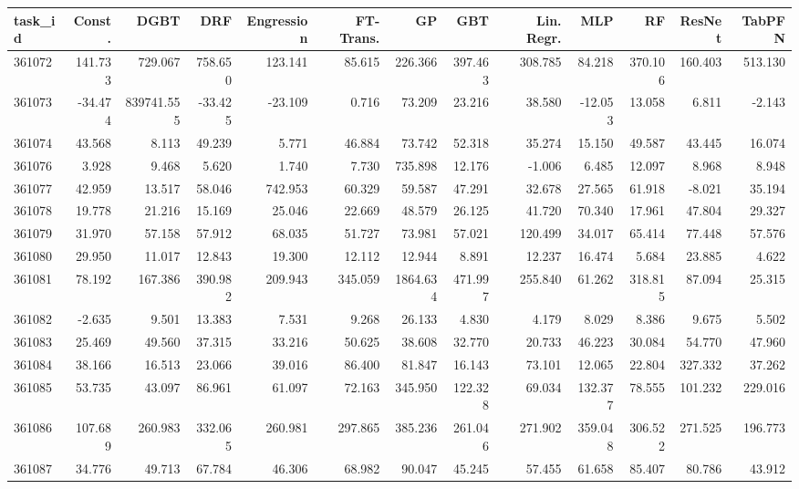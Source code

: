 \begin{tabular}{lrrrrrrrrrrrr}
\toprule
task\_id & Const. & DGBT & DRF & Engression & FT-Trans. & GP & GBT & Lin. Regr. & MLP & RF & ResNet & TabPFN \\
\midrule
361072 & 141.733 & 729.067 & 758.650 & 123.141 & 85.615 & 226.366 & 397.463 & 308.785 & 84.218 & 370.106 & 160.403 & 513.130 \\
361073 & -34.474 & 839741.555 & -33.425 & -23.109 & 0.716 & 73.209 & 23.216 & 38.580 & -12.053 & 13.058 & 6.811 & -2.143 \\
361074 & 43.568 & 8.113 & 49.239 & 5.771 & 46.884 & 73.742 & 52.318 & 35.274 & 15.150 & 49.587 & 43.445 & 16.074 \\
361076 & 3.928 & 9.468 & 5.620 & 1.740 & 7.730 & 735.898 & 12.176 & -1.006 & 6.485 & 12.097 & 8.968 & 8.948 \\
361077 & 42.959 & 13.517 & 58.046 & 742.953 & 60.329 & 59.587 & 47.291 & 32.678 & 27.565 & 61.918 & -8.021 & 35.194 \\
361078 & 19.778 & 21.216 & 15.169 & 25.046 & 22.669 & 48.579 & 26.125 & 41.720 & 70.340 & 17.961 & 47.804 & 29.327 \\
361079 & 31.970 & 57.158 & 57.912 & 68.035 & 51.727 & 73.981 & 57.021 & 120.499 & 34.017 & 65.414 & 77.448 & 57.576 \\
361080 & 29.950 & 11.017 & 12.843 & 19.300 & 12.112 & 12.944 & 8.891 & 12.237 & 16.474 & 5.684 & 23.885 & 4.622 \\
361081 & 78.192 & 167.386 & 390.982 & 209.943 & 345.059 & 1864.634 & 471.997 & 255.840 & 61.262 & 318.815 & 87.094 & 25.315 \\
361082 & -2.635 & 9.501 & 13.383 & 7.531 & 9.268 & 26.133 & 4.830 & 4.179 & 8.029 & 8.386 & 9.675 & 5.502 \\
361083 & 25.469 & 49.560 & 37.315 & 33.216 & 50.625 & 38.608 & 32.770 & 20.733 & 46.223 & 30.084 & 54.770 & 47.960 \\
361084 & 38.166 & 16.513 & 23.066 & 39.016 & 86.400 & 81.847 & 16.143 & 73.101 & 12.065 & 22.804 & 327.332 & 37.262 \\
361085 & 53.735 & 43.097 & 86.961 & 61.097 & 72.163 & 345.950 & 122.328 & 69.034 & 132.377 & 78.555 & 101.232 & 229.016 \\
361086 & 107.689 & 260.983 & 332.065 & 260.981 & 297.865 & 385.236 & 261.046 & 271.902 & 359.048 & 306.522 & 271.525 & 196.773 \\
361087 & 34.776 & 49.713 & 67.784 & 46.306 & 68.982 & 90.047 & 45.245 & 57.455 & 61.658 & 85.407 & 80.786 & 43.912 \\

\end{tabular}
